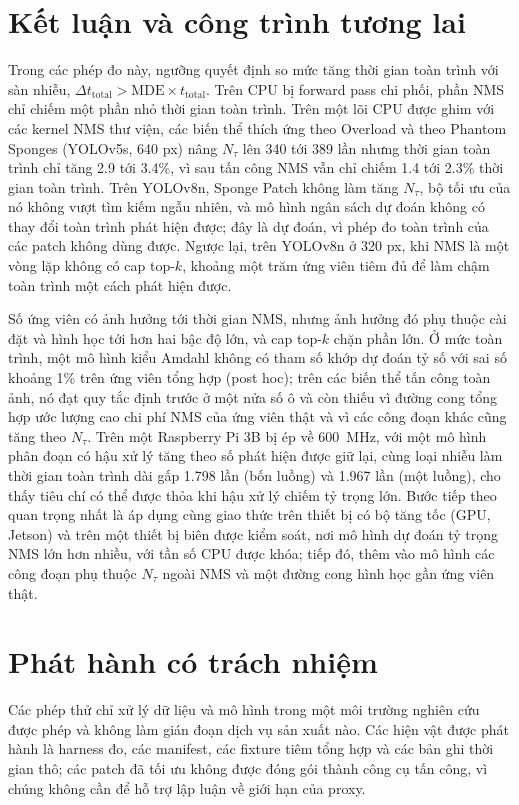 \documentclass[a4paper,fleqn]{cas-dc}
\newcommand{\Ntau}{N_{\tau}}
\begin{document}
\section{Kết luận và công trình tương lai}
\label{sec:conclusion}
Trong các phép đo này, ngưỡng quyết định so mức tăng thời gian toàn trình với sàn nhiễu, $\Delta t_{\mathrm{total}} > \mathrm{MDE}\times t_{\mathrm{total}}$. Trên CPU bị forward pass chi phối, phần NMS chỉ chiếm một phần nhỏ thời gian toàn trình. Trên một lõi CPU được ghim với các kernel NMS thư viện, các biến thể thích ứng theo Overload và theo Phantom Sponges (YOLOv5s, 640 px) nâng $\Ntau$ lên 340 tới 389 lần nhưng thời gian toàn trình chỉ tăng 2.9 tới 3.4\%, vì sau tấn công NMS vẫn chỉ chiếm 1.4 tới 2.3\% thời gian toàn trình. Trên YOLOv8n, Sponge Patch không làm tăng $\Ntau$, bộ tối ưu của nó không vượt tìm kiếm ngẫu nhiên, và mô hình ngân sách dự đoán không có thay đổi toàn trình phát hiện được; đây là dự đoán, vì phép đo toàn trình của các patch không dùng được. Ngược lại, trên YOLOv8n ở 320 px, khi NMS là một vòng lặp không có cap top-$k$, khoảng một trăm ứng viên tiêm đủ để làm chậm toàn trình một cách phát hiện được.

Số ứng viên có ảnh hưởng tới thời gian NMS, nhưng ảnh hưởng đó phụ thuộc cài đặt và hình học tới hơn hai bậc độ lớn, và cap top-$k$ chặn phần lớn. Ở mức toàn trình, một mô hình kiểu Amdahl không có tham số khớp dự đoán tỷ số với sai số khoảng 1\% trên ứng viên tổng hợp (post hoc); trên các biến thể tấn công toàn ảnh, nó đạt quy tắc định trước ở một nửa số ô và còn thiếu vì đường cong tổng hợp ước lượng cao chi phí NMS của ứng viên thật và vì các công đoạn khác cũng tăng theo $\Ntau$. Trên một Raspberry Pi 3B bị ép về 600~MHz, với một mô hình phân đoạn có hậu xử lý tăng theo số phát hiện được giữ lại, cùng loại nhiễu làm thời gian toàn trình dài gấp 1.798 lần (bốn luồng) và 1.967 lần (một luồng), cho thấy tiêu chí có thể được thỏa khi hậu xử lý chiếm tỷ trọng lớn. Bước tiếp theo quan trọng nhất là áp dụng cùng giao thức trên thiết bị có bộ tăng tốc (GPU, Jetson) và trên một thiết bị biên được kiểm soát, nơi mô hình dự đoán tỷ trọng NMS lớn hơn nhiều, với tần số CPU được khóa; tiếp đó, thêm vào mô hình các công đoạn phụ thuộc $\Ntau$ ngoài NMS và một đường cong hình học gần ứng viên thật.

\section*{Phát hành có trách nhiệm}
Các phép thử chỉ xử lý dữ liệu và mô hình trong một môi trường nghiên cứu được phép và không làm gián đoạn dịch vụ sản xuất nào. Các hiện vật được phát hành là harness đo, các manifest, các fixture tiêm tổng hợp và các bản ghi thời gian thô; các patch đã tối ưu không được đóng gói thành công cụ tấn công, vì chúng không cần để hỗ trợ lập luận về giới hạn của proxy.
\end{document}
